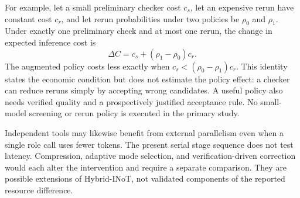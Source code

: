 For example, let a small preliminary checker cost $c_s$, let an expensive rerun have constant cost $c_r$, and let rerun probabilities under two policies be $\rho_0$ and $\rho_1$. Under exactly one preliminary check and at most one rerun, the change in expected inference cost is
\begin{equation}
\Delta C=c_s+(\rho_1-\rho_0)c_r.
\label{eq:hybrid-screen}
\end{equation}
The augmented policy costs less exactly when $c_s<(\rho_0-\rho_1)c_r$. This identity states the economic condition but does not estimate the policy effect: a checker can reduce reruns simply by accepting wrong candidates. A useful policy also needs verified quality and a prospectively justified acceptance rule. No small-model screening or rerun policy is executed in the primary study.

Independent tools may likewise benefit from external parallelism even when a single role call uses fewer tokens. The present serial stage sequence does not test latency. Compression, adaptive mode selection, and verification-driven correction would each alter the intervention and require a separate comparison. They are possible extensions of Hybrid-INoT, not validated components of the reported resource difference.
